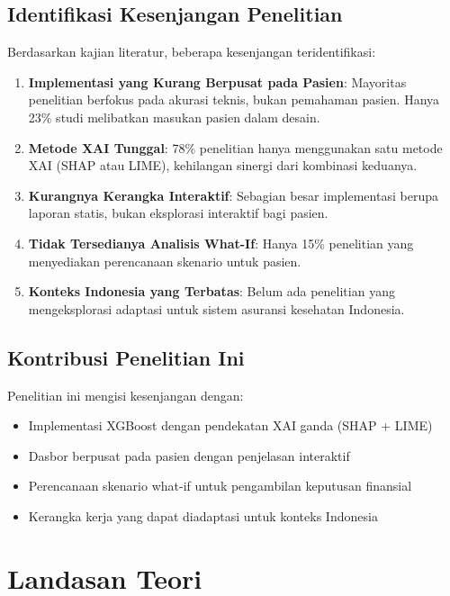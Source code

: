\subsection{Identifikasi Kesenjangan Penelitian}
Berdasarkan kajian literatur, beberapa kesenjangan teridentifikasi:

\begin{enumerate}
    \item \textbf{Implementasi yang Kurang Berpusat pada Pasien}: Mayoritas penelitian berfokus pada akurasi teknis, bukan pemahaman pasien. Hanya 23\% studi melibatkan masukan pasien dalam desain.

    \item \textbf{Metode XAI Tunggal}: 78\% penelitian hanya menggunakan satu metode XAI (SHAP atau LIME), kehilangan sinergi dari kombinasi keduanya.

    \item \textbf{Kurangnya Kerangka Interaktif}: Sebagian besar implementasi berupa laporan statis, bukan eksplorasi interaktif bagi pasien.

    \item \textbf{Tidak Tersedianya Analisis What-If}: Hanya 15\% penelitian yang menyediakan perencanaan skenario untuk pasien.

    \item \textbf{Konteks Indonesia yang Terbatas}: Belum ada penelitian yang mengeksplorasi adaptasi untuk sistem asuransi kesehatan Indonesia.
\end{enumerate}

\subsection{Kontribusi Penelitian Ini}
Penelitian ini mengisi kesenjangan dengan:
\begin{itemize}
    \item Implementasi XGBoost dengan pendekatan XAI ganda (SHAP + LIME)
    \item Dasbor berpusat pada pasien dengan penjelasan interaktif
    \item Perencanaan skenario what-if untuk pengambilan keputusan finansial
    \item Kerangka kerja yang dapat diadaptasi untuk konteks Indonesia
\end{itemize}

\section{Landasan Teori}

